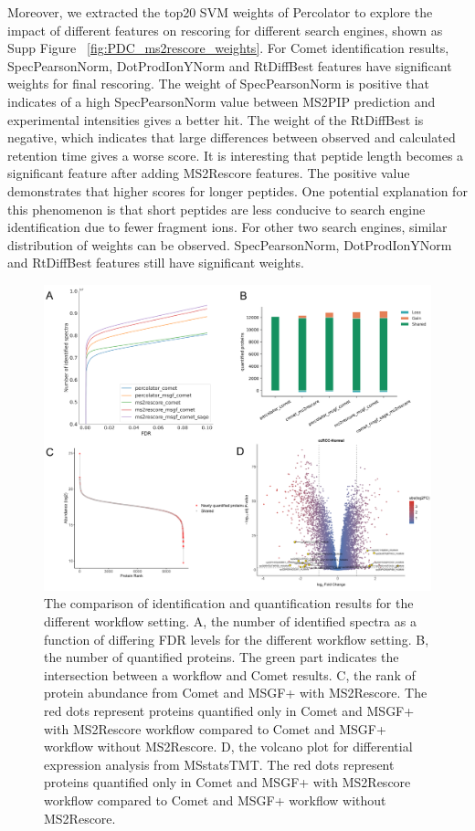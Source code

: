 \documentclass[12pt]{article}
\begin{document}
Moreover, we extracted the top20 SVM weights of Percolator to explore the impact of different features on rescoring for different search engines, shown as Supp Figure ~\ref{fig:PDC_ms2rescore_weights}. For Comet identification results, SpecPearsonNorm, DotProdIonYNorm and RtDiffBest features have significant weights for final rescoring. The weight of SpecPearsonNorm is positive that indicates of a high SpecPearsonNorm value between MS2PIP prediction and experimental intensities gives a better hit. The weight of the RtDiffBest is negative, which indicates that large differences between observed and calculated retention time gives a worse score. It is interesting that peptide length becomes a significant feature after adding MS2Rescore features. The positive value demonstrates that higher scores for longer peptides. One potential explanation for this phenomenon is that short peptides are less conducive to search engine identification due to fewer fragment ions. For other two search engines, similar distribution of weights can be observed. SpecPearsonNorm, DotProdIonYNorm and RtDiffBest features still have significant weights.


\begin{figure}[h!]
	\centering
	\includegraphics[width=1\textwidth]{figures//CPTAC_TMT.png}
	\caption{The comparison of identification and quantification results for the different workflow setting. A, the number of identified spectra as a function of differing FDR levels for the different workflow setting. B, the number of quantified proteins. The green part indicates the intersection between a workflow and Comet results. C, the rank of protein abundance from Comet and MSGF+ with MS2Rescore. The red dots represent proteins quantified only in Comet and MSGF+ with MS2Rescore workflow compared to Comet and MSGF+ workflow without MS2Rescore. D, the volcano plot for differential expression analysis from MSstatsTMT. The red dots represent proteins quantified only in Comet and MSGF+ with MS2Rescore workflow compared to Comet and MSGF+ workflow without MS2Rescore.}
	\label{fig:PDC_ms2rescore}
\end{figure}
\end{document}
